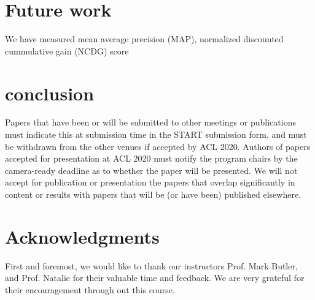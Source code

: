 \documentclass[11pt,a4paper]{article}
\begin{document}
\section{Future work}
We have measured mean average precision (MAP), normalized discounted cummulative gain (NCDG) score


\section{conclusion}
Papers that have been or will be submitted to other meetings or publications must indicate this at submission time in the START submission form, and must be withdrawn from the other venues if accepted by ACL 2020. Authors of papers accepted for presentation at ACL 2020 must notify the program chairs by the camera-ready deadline as to whether the paper will be presented. We will not accept for publication or presentation the papers that overlap significantly in content or results with papers that will be (or have been) published elsewhere.



\section*{Acknowledgments}

First and foremost, we would like to thank our instructors Prof. Mark Butler, and Prof. Natalie for their valuable time and feedback. We are very grateful for their encouragement through out this course.

%
%
\end{document}
